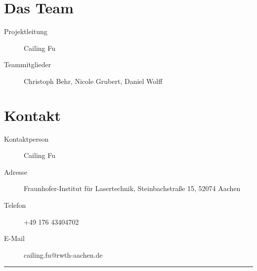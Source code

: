 \documentclass[a4paper,12pt,notumble]{leaflet}
\begin{document}
\noindent
\begin{minipage}[c][0.45\textheight][t]{\textwidth}
	\section{Das Team}
	\begin{description}
		\item[Projektleitung] Cailing Fu
		\item[Teammitglieder] Christoph Behr, Nicole Grubert, Daniel Wolff
	\end{description}

	\section{Kontakt}
	\begin{description}
		\item[Kontaktperson] Cailing Fu 
		\item[Adresse] Fraunhofer-Institut für Lasertechnik, Steinbachstraße 15, 52074 Aachen
		\item[Telefon] +49 176 43404702
		\item[E-Mail] cailing.fu@rwth-aachen.de
	\end{description}
\end{minipage}

\textcolor{rwth-lblue}{\noindent\rule{\textwidth}{4pt}}
\end{document}
